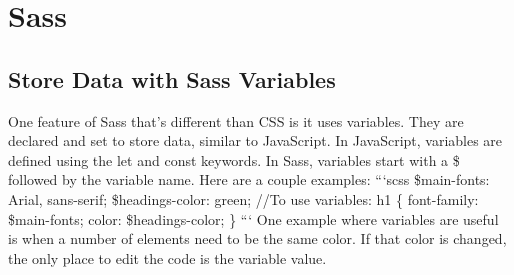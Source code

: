 \documentclass{article}%
\begin{document}
%
\newpage%
\section{Sass}%
\label{sec:Sass}%
\subsection{Store Data with Sass Variables}%
\label{subsec:StoreDatawithSassVariables}%
One feature of Sass that's different than CSS is it uses variables. They are declared and set to store data, similar to JavaScript.\newline%
In JavaScript, variables are defined using the let and const keywords. In Sass, variables start with a \$ followed by the variable name.\newline%
Here are a couple examples:\newline%
```scss\newline%
\$main{-}fonts: Arial, sans{-}serif;\newline%
\$headings{-}color: green;\newline%
//To use variables:\newline%
h1 \{\newline%
  font{-}family: \$main{-}fonts;\newline%
  color: \$headings{-}color;\newline%
\}\newline%
```\newline%
One example where variables are useful is when a number of elements need to be the same color. If that color is changed, the only place to edit the code is the variable value.\newline%

%
\end{document}
